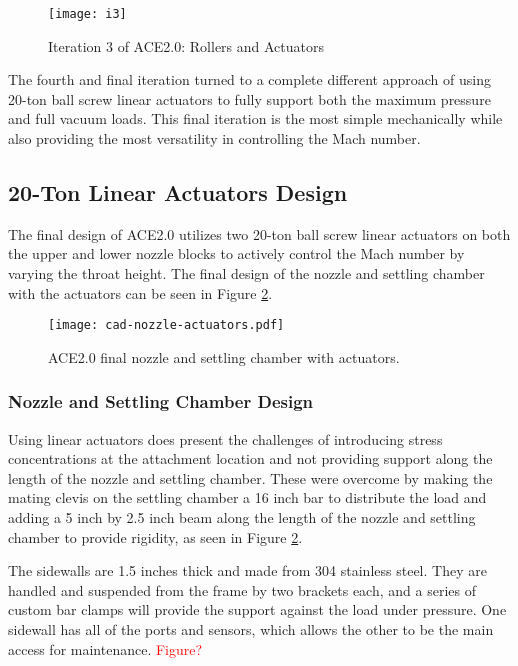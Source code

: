 \begin{figure}[ht!]
    \centering
    \texttt{[image: i3]}
    \caption{Iteration 3 of ACE2.0: Rollers and Actuators}
    \label{fig:i3}
\end{figure}

The fourth and final iteration turned to a complete different approach of using 20-ton ball screw linear actuators to fully support both the maximum pressure and full vacuum loads. This final iteration is the most simple mechanically while also providing the most versatility in controlling the Mach number.

\subsection{20-Ton Linear Actuators Design}

The final design of ACE2.0 utilizes two 20-ton ball screw linear actuators on both the upper and lower nozzle blocks to actively control the Mach number by varying the throat height. The final design of the nozzle and settling chamber with the actuators can be seen in Figure \ref{fig:cad-nozzle-actuators}. 

\begin{figure}[ht!]
    \centering
    \texttt{[image: cad-nozzle-actuators.pdf]}
    \caption{ACE2.0 final nozzle and settling chamber with actuators.}
    \label{fig:cad-nozzle-actuators}
\end{figure}

\subsubsection{Nozzle and Settling Chamber Design}

Using linear actuators does present the challenges of introducing stress concentrations at the attachment location and not providing support along the length of the nozzle and settling chamber. These were overcome by making the mating clevis on the settling chamber a 16 inch bar to distribute the load and adding a 5 inch by 2.5 inch beam along the length of the nozzle and settling chamber to provide rigidity, as seen in Figure \ref{fig:cad-nozzle-actuators}.

The sidewalls are 1.5 inches thick and made from 304 stainless steel. They are handled and suspended from the frame by two brackets each, and a series of custom bar clamps will provide the support against the load under pressure. One sidewall has all of the ports and sensors, which allows the other to be the main access for maintenance. \textcolor{red}{Figure?}

